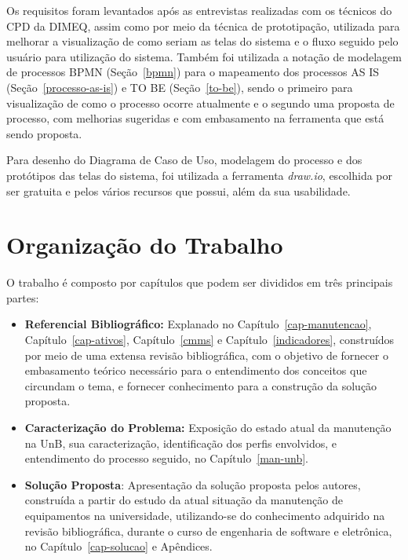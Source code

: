Os requisitos foram levantados após as entrevistas realizadas com os técnicos do CPD da DIMEQ, assim como por meio da técnica de prototipação, utilizada para melhorar a visualização de como seriam as telas do sistema e o fluxo seguido pelo usuário para utilização do sistema. Também foi utilizada a notação de modelagem de processos BPMN (Seção~\ref{bpmn}) para o mapeamento dos processos AS IS (Seção~\ref{processo-as-is}) e TO BE (Seção~\ref{to-be}), sendo o primeiro para visualização de como o processo ocorre atualmente e o segundo uma proposta de processo, com melhorias sugeridas e com embasamento na ferramenta que está sendo proposta.

Para desenho do Diagrama de Caso de Uso, modelagem do processo e dos protótipos das telas do sistema, foi utilizada a ferramenta \textit{draw.io}, escolhida por ser gratuita e pelos vários recursos que possui, além da sua usabilidade.


\section{Organização do Trabalho}

O trabalho é composto por capítulos que podem ser divididos em três principais partes:

\begin{itemize}
	\item \textbf{Referencial Bibliográfico:} Explanado no Capítulo~\ref{cap-manutencao}, Capítulo~\ref{cap-ativos}, Capítulo~\ref{cmms} e Capítulo~\ref{indicadores}, construídos por meio de uma extensa revisão bibliográfica, com o objetivo de fornecer o embasamento teórico necessário para o entendimento dos conceitos que circundam o tema, e fornecer conhecimento para a construção da solução proposta.
	\item \textbf{Caracterização do Problema:} Exposição do estado atual da manutenção na UnB, sua caracterização, identificação dos perfis envolvidos, e entendimento do processo seguido, no Capítulo~\ref{man-unb}. 
	\item \textbf{Solução Proposta}: Apresentação da solução proposta pelos autores, construída a partir do estudo da atual situação da manutenção de equipamentos na universidade, utilizando-se do conhecimento adquirido na revisão bibliográfica, durante o curso de engenharia de software e eletrônica, no Capítulo~\ref{cap-solucao} e Apêndices.
\end{itemize}

